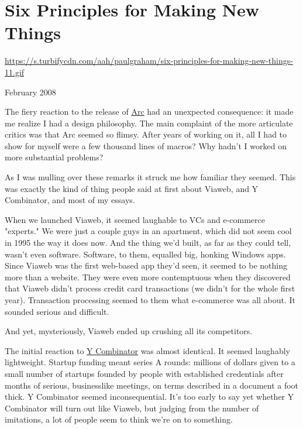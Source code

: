 \chapter{Six Principles for Making New Things}

\href{https://s.turbifycdn.com/aah/paulgraham/six-principles-for-making-new-things-11.gif}{https://s.turbifycdn.com/aah/paulgraham/six-principles-for-making-new-things-11.gif}



February 2008

The fiery reaction to the release of \href{http://www.paulgraham.com/arc.html}{Arc} had
an unexpected consequence: it made me realize I had a design
philosophy.  The main complaint of the more articulate critics was
that Arc seemed so flimsy. After years of working on it, all I had
to show for myself were a few thousand lines of macros?  Why hadn't
I worked on more substantial problems?

As I was mulling over these remarks it struck me how familiar they
seemed.  This was exactly the kind of thing people said at first
about Viaweb, and Y Combinator, and most of my essays.

When we launched Viaweb, it seemed laughable to VCs and e-commerce
"experts."  We were just a couple guys in an apartment,
which did not seem cool in 1995 the way it does now.  And the thing
we'd built, as far as they could tell, wasn't even software.
Software, to them, equalled big, honking Windows apps.  Since Viaweb
was the first web-based app 
they'd seen, it seemed to be nothing
more than a website.  They were even more contemptuous when they
discovered that Viaweb didn't process credit card transactions (we
didn't for the whole first year).  Transaction processing seemed
to them what e-commerce was all about.  It sounded serious and
difficult.

And yet, mysteriously, Viaweb ended up crushing all its competitors.

The initial reaction to 
\href{http://ycombinator.com}{Y Combinator} was almost identical.  It
seemed laughably lightweight.  Startup funding meant series A rounds:
millions of dollars given to a small number of startups founded by
people with established credentials after months of serious,
businesslike meetings, on terms described in a document a foot
thick.  Y Combinator seemed inconsequential.  It's too early to say
yet whether Y Combinator will turn out like Viaweb, but judging
from the number of imitations, a lot of people seem to think we're
on to something.

